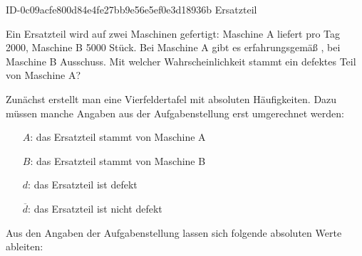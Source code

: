 \begin{exercise}
      {ID-0c09acfe800d84e4fe27bb9e56e5ef0e3d18936b}
      {Ersatzteil}
  \ifproblem\problem\par
    Ein Ersatzteil wird auf zwei Maschinen gefertigt:
    Maschine A liefert pro Tag \num{2000}, Maschine B
    \num{5000} Stück. Bei Maschine A gibt es
    erfahrungsgemäß , bei Maschine B 
    Ausschuss. Mit welcher Wahrscheinlichkeit stammt
    ein defektes Teil von Maschine A?
  \fi
  \ifoutline\outline\par
    Zunächst erstellt man eine Vierfeldertafel mit
    absoluten Häufigkeiten. Dazu müssen manche
    Angaben aus der Aufgabenstellung erst
    umgerechnet werden:\par
    \begin{minipage}{0.46\linewidth}
      \begin{fofotab}%
        \andAb{}
        \andab{}
        \sumB {}
        \sumb {}
        \total{}
      \end{fofotab}
    \end{minipage}%
    \begin{minipage}{0.53\linewidth}
      \begin{itemize}
        \renewcommand{\itemsep}{-1ex}%
        \item[$A$:] \glqq das Ersatzteil stammt von Maschine A\grqq
        \item[$B$:] \glqq das Ersatzteil stammt von Maschine B\grqq
        \item[$d$:] \glqq das Ersatzteil ist defekt\grqq
        \item[$\overline{d}$:] \glqq das Ersatzteil ist nicht defekt\grqq
      \end{itemize}
    \end{minipage}\par
  \fi
  \ifoutcome\outcome\par
    Aus den Angaben der Aufgabenstellung lassen sich
    folgende absoluten Werte ableiten:\par
    \begin{minipage}{0.4\linewidth}
      \begin{fofotab}%

\end{fofotab}
\end{minipage}
\end{exercise}
